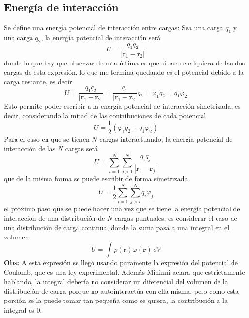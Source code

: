 \subsection{Energía de interacción}
Se define una energía potencial de interacción entre cargas: Sea una carga $q_{1}$ y una carga $q_{2}$, la energía potencial de interacción será
\begin{equation*}
    U = \frac{q_{1}q_{2}}{|\textbf{r}_{1}-\textbf{r}_{2}|}
\end{equation*}
donde lo que hay que observar de esta última es que si saco cualquiera de las dos cargas de esta expresión, lo que me termina quedando es el potencial debido a la carga restante, es decir
\begin{equation*}
    U = \frac{q_{1}q_{2}}{|\textbf{r}_{1}-\textbf{r}_{2}|}
    = \frac{q_{1}}{|\textbf{r}_{1}-\textbf{r}_{2}|}q_{2}
    = \varphi_{1}q_{2}
    = q_{1}\varphi_{2}
\end{equation*}
Esto permite poder escribir a la energía potencial de interacción simetrizada, es decir, considerando la mitad de las contribuciones de cada potencial
\begin{equation*}
    U = \frac{1}{2}
    \left(
        \varphi_{1}q_{2} + q_{1}\varphi_{2}
    \right)
\end{equation*}
Para el caso en que se tienen $N$ cargas interactuando, la energía potencial de interacción de las $N$ cargas será
\begin{equation*}
    U = \sum\limits_{i=1}^{N}
    \sum\limits_{j > 1}^{N}
    \frac{q_{i}q_{j}}{|\textbf{r}_{i}-\textbf{r}_{j}|}
\end{equation*}
que de la misma forma se puede escribir de forma simetrizada
\begin{equation*}
    U = \frac{1}{2}
    \sum\limits_{i=1}^{N}
    \sum\limits_{j>i}^{N}
    q_{i}\varphi_{j}
\end{equation*}
el próximo paso que se puede hacer una vez que se tiene la energía potencial de interacción de una distribución de $N$ cargas puntuales, es considerar el caso de una distribución de carga continua, donde la suma pasa a una integral en el volumen
\begin{equation*}
    U = \int \rho(\textbf{r})\varphi(\textbf{r})\,dV
\end{equation*}
\textbf{Obs:} A esta expresión se llegó usando puramente la expresión del potencial de Coulomb, que es una ley experimental. Además Mininni aclara que estrictamente hablando, la integral debería no considerar un diferencial del volumen de la distribución de carga porque no autointeractúa con ella misma, pero como esta porción se la puede tomar tan pequeña como se quiera, la contribución a la integral es 0.\\
